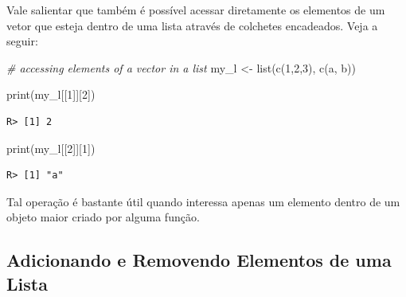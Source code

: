 \documentclass[
  11pt,
]{book}
\newenvironment{Shaded}{\begin{snugshade}}{\end{snugshade}}
\newcommand{\CommentTok}[1]{\textcolor[rgb]{0.37,0.37,0.37}{\textit{#1}}}
\newcommand{\DecValTok}[1]{\textcolor[rgb]{0.06,0.06,0.06}{#1}}
\newcommand{\FunctionTok}[1]{\textcolor[rgb]{0,0,0}{#1}}
\newcommand{\NormalTok}[1]{#1}
\newcommand{\OtherTok}[1]{\textcolor[rgb]{0.37,0.37,0.37}{#1}}
\newcommand{\SpecialCharTok}[1]{\textcolor[rgb]{0,0,0}{#1}}
\newcommand{\StringTok}[1]{\textcolor[rgb]{0.5,0.5,0.5}{#1}}
\begin{document}
\begin{Shaded}
\end{Shaded}

Vale salientar que também é possível acessar diretamente os elementos de um vetor que esteja dentro de uma lista através de colchetes encadeados. Veja a seguir:

\begin{Shaded}
\begin{Highlighting}[]
\CommentTok{\# accessing elements of a vector in a list}
\NormalTok{my\_l }\OtherTok{\textless{}{-}} \FunctionTok{list}\NormalTok{(}\FunctionTok{c}\NormalTok{(}\DecValTok{1}\NormalTok{,}\DecValTok{2}\NormalTok{,}\DecValTok{3}\NormalTok{),}
             \FunctionTok{c}\NormalTok{(}\StringTok{\textquotesingle{}a\textquotesingle{}}\NormalTok{, }\StringTok{\textquotesingle{}b\textquotesingle{}}\NormalTok{))}

\FunctionTok{print}\NormalTok{(my\_l[[}\DecValTok{1}\NormalTok{]][}\DecValTok{2}\NormalTok{])}
\end{Highlighting}
\end{Shaded}

\begin{verbatim}
R> [1] 2
\end{verbatim}

\begin{Shaded}
\begin{Highlighting}[]
\FunctionTok{print}\NormalTok{(my\_l[[}\DecValTok{2}\NormalTok{]][}\DecValTok{1}\NormalTok{])}
\end{Highlighting}
\end{Shaded}

\begin{verbatim}
R> [1] "a"
\end{verbatim}

Tal operação é bastante útil quando interessa apenas um elemento dentro de um objeto maior criado por alguma função.

\hypertarget{adicionando-e-removendo-elementos-de-uma-lista}{%
\subsection{Adicionando e Removendo Elementos de uma Lista}\label{adicionando-e-removendo-elementos-de-uma-lista}}
\end{document}
